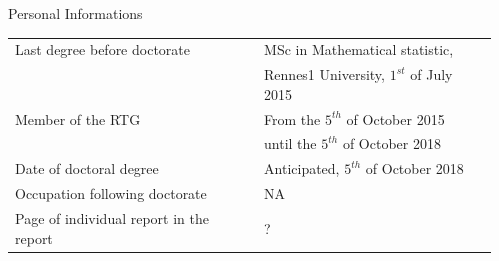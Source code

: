 \documentclass[final,hyperref={pdfpagelabels=false}]{beamer}
\begin{document}
\begin{frame}[t]
\begin{columns}[t]
\begin{column}{.30\textwidth}

\begin{block}{\rule{0pt}{2.5ex} Personal Informations}
\begin{tabular}{ll}
Last degree before doctorate & MSc in Mathematical statistic,\\
					     & Rennes1 University, $1^{st}$ of July 2015\\ 
Member of the RTG & From the $5^{th}$ of October 2015\\
				& until the $5^{th}$ of October 2018\\
Date of doctoral degree & Anticipated, $5^{th}$ of October 2018\\
Occupation following doctorate & NA \\
Page of individual report in the report & ?
\end{tabular}
\end{block}


\end{column} %

\begin{column}{.02\textwidth}\end{column} %

\end{columns} %

\end{frame} %



\end{document}
